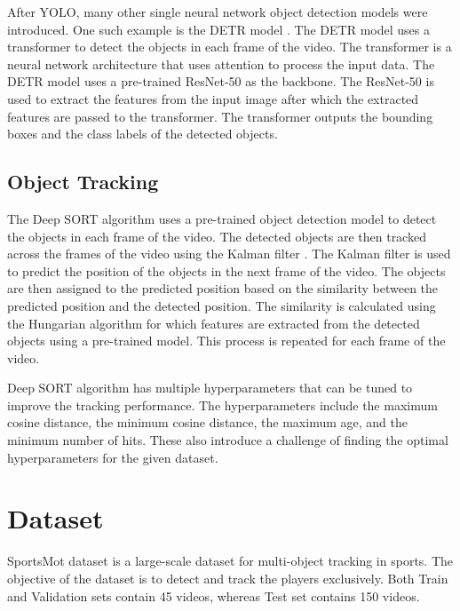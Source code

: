 \documentclass[runningheads]{llncs}
\begin{document}
After YOLO, many other single neural network object detection models were introduced.
One such example is the DETR model \cite{detr2020}.
The DETR model uses a transformer \cite{transformer2017} to detect the objects in each frame of the video.
The transformer is a neural network architecture that uses attention to process the input data.
The DETR model uses a pre-trained ResNet-50 \cite{resnet2015} as the backbone.
The ResNet-50 is used to extract the features from the input image after which the extracted features are passed to the transformer.
The transformer outputs the bounding boxes and the class labels of the detected objects.


\subsection{Object Tracking}
The Deep SORT algorithm uses a pre-trained object detection model to detect the objects in each frame of the video.
The detected objects are then tracked across the frames of the video using the Kalman filter \cite{kalman1960new}.
The Kalman filter is used to predict the position of the objects in the next frame of the video.
The objects are then assigned to the predicted position based on the similarity between the predicted position and the detected position.
The similarity is calculated using the Hungarian algorithm \cite{hungarian1955} for which features are extracted from the detected objects using a pre-trained model.
This process is repeated for each frame of the video.

Deep SORT algorithm has multiple hyperparameters that can be tuned to improve the tracking performance.
The hyperparameters include the maximum cosine distance, the minimum cosine distance, the maximum age, and the minimum number of hits.
These also introduce a challenge of finding the optimal hyperparameters for the given dataset.


\section{Dataset}

SportsMot dataset \cite{cui2023sportsmot} is a large-scale dataset for multi-object tracking in sports.
The objective of the dataset is to detect and track the players exclusively.
Both Train and Validation sets contain 45 videos, whereas Test set contains 150 videos.
\end{document}
